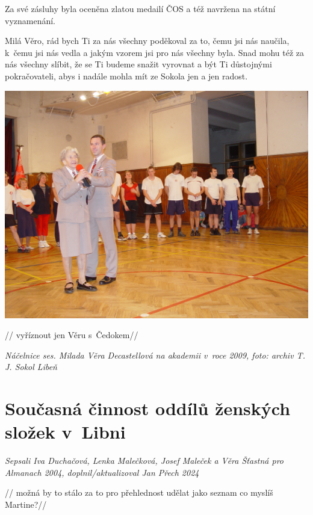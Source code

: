 \documentclass[a5paper, 11pt, twoside]{article}
\begin{document}
Za své zásluhy byla oceněna zlatou medailí ČOS a též navržena na státní
vyznamenání.

Milá Věro, rád bych Ti za nás všechny poděkoval za to, čemu jsi nás
naučila, k~čemu jsi nás vedla a jakým vzorem jsi pro nás všechny byla.
Snad mohu též za nás všechny slíbit, že se Ti budeme snažit vyrovnat a
být Ti důstojnými pokračovateli, abys i nadále mohla mít ze Sokola jen a
jen radost.

 \includegraphics[width=\textwidth]{img/73_vera_cedok.JPG}

// vyříznout jen Věru s~Čedokem//

\textit{Náčelnice ses. Milada Věra Decastellová na akademii v~roce 2009,
foto: archiv T. J. Sokol Libeň}

\section{Současná činnost oddílů ženských složek
v~Libni}

\textit{Sepsali Iva Duchačová, Lenka Malečková, Josef Maleček a Věra
Šťastná pro Almanach 2004, doplnil/aktualizoval Jan Přech 2024}

// možná by to stálo za to pro přehlednost udělat jako seznam co myslíš
Martine?//
\end{document}
